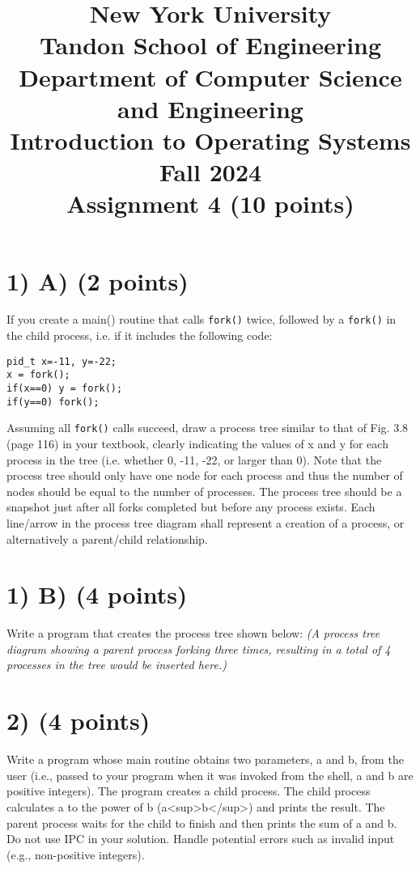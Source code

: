 \documentclass{article}
\begin{document}
\title{New York University \\ Tandon School of Engineering \\ Department of Computer Science and Engineering \\ Introduction to Operating Systems \\ Fall 2024 \\ Assignment 4 (10 points)}
\date{}
\maketitle

\section*{1) A) (2 points)}
If you create a main() routine that calls \texttt{fork()} twice, followed by a \texttt{fork()} in the child process, i.e. if it includes the following code:
\begin{verbatim}
pid_t x=-11, y=-22;
x = fork();
if(x==0) y = fork();
if(y==0) fork();
\end{verbatim}
Assuming all \texttt{fork()} calls succeed, draw a process tree similar to that of Fig. 3.8 (page 116) in your textbook, clearly indicating the values of x and y for each process in the tree (i.e. whether 0, -11, -22, or larger than 0).
Note that the process tree should only have one node for each process and thus the number of nodes should be equal to the number of processes.
The process tree should be a snapshot just after all forks completed but before any process exists.
Each line/arrow in the process tree diagram shall represent a creation of a process, or alternatively a parent/child relationship.

\section*{1) B) (4 points)}
Write a program that creates the process tree shown below:
\textit{(A process tree diagram showing a parent process forking three times, resulting in a total of 4 processes in the tree would be inserted here.)}

\section*{2) (4 points)}
Write a program whose main routine obtains two parameters, a and b, from the user (i.e., passed to your program when it was invoked from the shell, a and b are positive integers).  The program creates a child process. The child process calculates a to the power of b (a<sup>b</sup>) and prints the result.  The parent process waits for the child to finish and then prints the sum of a and b.  Do not use IPC in your solution. Handle potential errors such as invalid input (e.g., non-positive integers).
\end{document}
